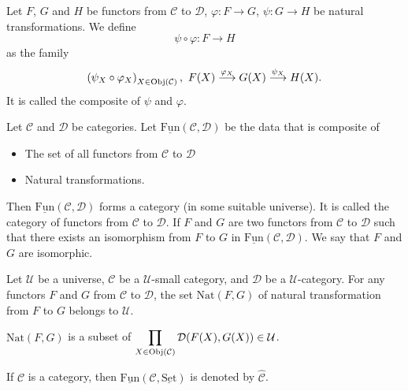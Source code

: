 \begin{exampleenv}
    Let $F$, $G$ and $H$ be functors from $\mathcal{C}$ to $\mathcal{D}$, $\varphi: F\rightarrow G$, $\psi:G\rightarrow H$ be natural transformations. We define
    $$\psi\circ \varphi: F\rightarrow H$$
    as the family 
    $$ \left(\psi_X\circ\varphi_X\right)_{X\in \Obj(\mathcal{C})},\ F(X)\overset{\varphi_X}{\longrightarrow}G(X)\overset{\psi_X}{\longrightarrow}H(X).$$
    It is called the composite of $\psi$ and $\varphi$.
\end{exampleenv}
\begin{remark}
    Let $\mathcal{C}$ and $\mathcal{D}$ be categories. Let $\underline{\mathrm{Fun}}(\mathcal{C},\mathcal{D})$ be the data that is composite of
    \begin{itemize}
        \item The set of all functors from $\mathcal{C}$ to $\mathcal{D}$
        \item Natural transformations.
    \end{itemize}
    Then $\underline{\mathrm{Fun}}(\mathcal{C},\mathcal{D})$ forms a category (in some suitable universe). It is called the category of functors from $\mathcal{C}$ to $\mathcal{D}$. If $F$ and $G$ are two functors from $\mathcal{C}$ to $\mathcal{D}$ such that there exists an isomorphism from $F$ to $G$ in $\underline{\mathrm{Fun}}(\mathcal{C},\mathcal{D})$. We say that $F$ and $G$ are isomorphic.
\end{remark}
\begin{propositionenv}
    Let $\mathcal{U}$ be a universe, $\mathcal{C}$ be a $\mathcal{U}$-small category, and $\mathcal{D}$ be a $\mathcal{U}$-category. For any functors $F$ and $G$ from $\mathcal{C}$ to $\mathcal{D}$, the set $\mathrm{Nat}(F,G)$ of natural transformation from $F$ to $G$ belongs to $\mathcal{U}$.
\end{propositionenv}
\begin{proofenv}
    $\mathrm{Nat}(F,G)$ is a subset of $\displaystyle \prod_{X\in \operatorname{\mathrm{Obj}}(\mathcal{C})}\mathcal{D}(F(X),G(X))\in \mathcal{U}$.
\end{proofenv}
\begin{notationenv}
    If $\mathcal{C}$ is a category, then $\underline{\mathrm{Fun}}(\mathcal{C},\underline{\mathrm{Set}})$ is denoted by $\hat{\mathcal{C}}$.
\end{notationenv}
\newpage
